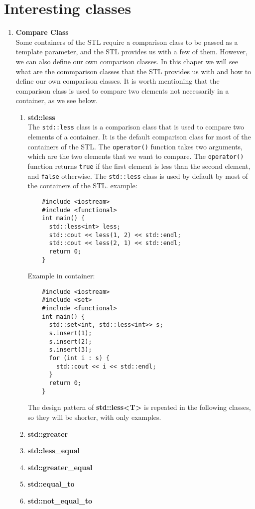 \section{Interesting classes}
\begin{enumerate}
  \item \textbf{Compare Class}\\
    Some containers of the STL require a comparison class to be passed as a template parameter, and the STL provides us with a few of them. However, we can also define our own comparison classes. In this chaper we will see what are the commparison classes that the STL provides us with and how to define our own comparison classes. 
    It is worth mentioning that the comparison class is used to compare two elements not necessarily in a container, as we see below.
    \begin{enumerate}
      \item \textbf{std::less} \\
	The \texttt{std::less} class is a comparison class that is used to compare two elements of a container. It is the default comparison class for most of the containers of the STL. The \texttt{operator()} function takes two arguments, which are the two elements that we want to compare. The \texttt{operator()} function returns \texttt{true} if the first element is less than the second element, and \texttt{false} otherwise. The \texttt{std::less} class is used by default by most of the containers of the STL.
	example:
	\begin{lstlisting}
	#include <iostream>
	#include <functional>
	int main() {
	  std::less<int> less;
	  std::cout << less(1, 2) << std::endl;
	  std::cout << less(2, 1) << std::endl;
	  return 0;
	}
	\end{lstlisting}
	Example in container:
	\begin{lstlisting}
	#include <iostream>
	#include <set>
	#include <functional>
	int main() {
	  std::set<int, std::less<int>> s;
	  s.insert(1);
	  s.insert(2);
	  s.insert(3);
	  for (int i : s) {
	    std::cout << i << std::endl;
	  }
	  return 0;
	}
	\end{lstlisting}
	The design pattern of \textbf{std::less<T>} is repeated in the following classes, so they will be shorter, with only examples.
      \item \textbf{std::greater}
      \item \textbf{std::less\_equal}
      \item \textbf{std::greater\_equal}
      \item \textbf{std::equal\_to}
      \item \textbf{std::not\_equal\_to}
    \end{enumerate}
\end{enumerate}
